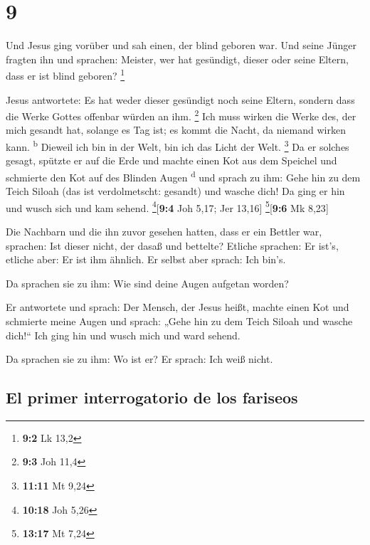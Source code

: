 \hypertarget{section-8}{%
\section{9}\label{section-8}}

 Und Jesus ging vorüber und sah einen, der blind geboren
war.  Und seine Jünger fragten ihn und sprachen: Meister,
wer hat gesündigt, dieser oder seine Eltern, dass er ist blind geboren?
\footnote{\textbf{9:2} Lk 13,2}

 Jesus antwortete: Es hat weder dieser gesündigt noch
seine Eltern, sondern dass die Werke Gottes offenbar würden an ihm.
\footnote{\textbf{9:3} Joh 11,4}  Ich muss wirken die
Werke des, der mich gesandt hat, solange es Tag ist; es kommt die Nacht,
da niemand wirken kann. \textsuperscript{b}  Dieweil ich
bin in der Welt, bin ich das Licht der Welt. \footnote{\textbf{11:11} Mt
  9,24}  Da er solches gesagt, spützte er auf die Erde und
machte einen Kot aus dem Speichel und schmierte den Kot auf des Blinden
Augen \textsuperscript{d}  und sprach zu ihm: Gehe hin zu
dem Teich Siloah (das ist verdolmetscht: gesandt) und wasche dich! Da
ging er hin und wusch sich und kam sehend. \footnote{\textbf{10:18} Joh
  5,26}{[}\textbf{9:4} Joh 5,17; Jer 13,16{]} \footnote{\textbf{13:17}
  Mt 7,24}{[}\textbf{9:6} Mk 8,23{]}

 Die Nachbarn und die ihn zuvor gesehen hatten, dass er
ein Bettler war, sprachen: Ist dieser nicht, der dasaß und bettelte?
 Etliche sprachen: Er ist's, etliche aber: Er ist ihm
ähnlich. Er selbst aber sprach: Ich bin's.

 Da sprachen sie zu ihm: Wie sind deine Augen aufgetan
worden?

 Er antwortete und sprach: Der Mensch, der Jesus heißt,
machte einen Kot und schmierte meine Augen und sprach: „Gehe hin zu dem
Teich Siloah und wasche dich!{}`` Ich ging hin und wusch mich und ward
sehend.

 Da sprachen sie zu ihm: Wo ist er? Er sprach: Ich weiß
nicht.

\hypertarget{el-primer-interrogatorio-de-los-fariseos}{%
\subsection{El primer interrogatorio de los
fariseos}\label{el-primer-interrogatorio-de-los-fariseos}}

